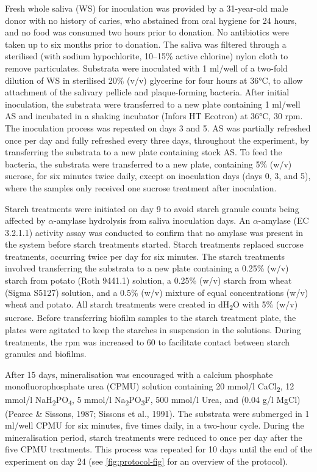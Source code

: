 \documentclass[
]{article}
\begin{document}
Fresh whole saliva (WS) for inoculation was provided by a 31-year-old male donor
with no history of caries, who abstained from oral hygiene for 24 hours, and no
food was consumed two hours prior to donation. No antibiotics were taken up to six
months prior to donation.
The saliva was filtered through a sterilised (with sodium hypochlorite, 10--15\% active chlorine)
nylon cloth to remove particulates.
Substrata were inoculated with 1 ml/well of a two-fold dilution of WS in sterilised
20\% (v/v) glycerine for four hours at 36°C, to allow attachment of the
salivary pellicle and plaque-forming bacteria. After initial inoculation, the
substrata were transferred to a new plate containing 1 ml/well AS and incubated
in a shaking incubator (Infors HT Ecotron) at 36°C, 30 rpm.
The inoculation process was repeated on days 3 and 5.
AS was partially refreshed once per day and fully refreshed every three days,
throughout the experiment, by transferring the substrata to a new plate containing
stock AS. To feed the bacteria, the substrata were transferred to a new plate, containing
5\% (w/v) sucrose, for six minutes twice daily, except on inoculation days
(days 0, 3, and 5), where the samples only received one sucrose treatment after
inoculation.

Starch treatments were initiated on day 9 to avoid starch granule counts being
affected by \(\alpha\)-amylase hydrolysis from saliva inoculation days.
An \(\alpha\)-amylase (EC 3.2.1.1) activity
assay was conducted to confirm that no amylase was present in the system before
starch treatments started. Starch treatments replaced sucrose treatments, occurring twice per day
for six minutes. The starch treatments involved transferring the substrata to a
new plate containing a 0.25\% (w/v) starch from potato (Roth 9441.1) solution, a 0.25\% (w/v) starch from wheat (Sigma S5127) solution, and a 0.5\% (w/v) mixture of equal
concentrations (w/v) wheat and potato. All starch treatments were created in dH\textsubscript{2}O
with 5\% (w/v) sucrose. Before transferring biofilm samples to the starch treatment
plate, the plates were agitated to keep the starches in suspension in the
solutions. During treatments, the rpm was increased to 60 to facilitate contact
between starch granules and biofilms.

After 15 days, mineralisation was encouraged with a
calcium phosphate monofluorophosphate urea (CPMU) solution containing
20 mmol/l CaCl\textsubscript{2}, 12 mmol/l NaH\textsubscript{2}PO\textsubscript{4}, 5 mmol/l Na\textsubscript{2}PO\textsubscript{3}F, 500 mmol/l Urea,
and (0.04 g/l MgCl)
(Pearce \& Sissons, 1987; Sissons et al., 1991).
The substrata were submerged in 1 ml/well CPMU for six minutes, five times
daily, in a two-hour cycle. During the mineralisation period, starch treatments
were reduced to once per day after the five CPMU treatments. This process was repeated
for 10 days until the end of the experiment on day 24
(see \ref{fig:protocol-fig} for an overview of the protocol).
\end{document}
